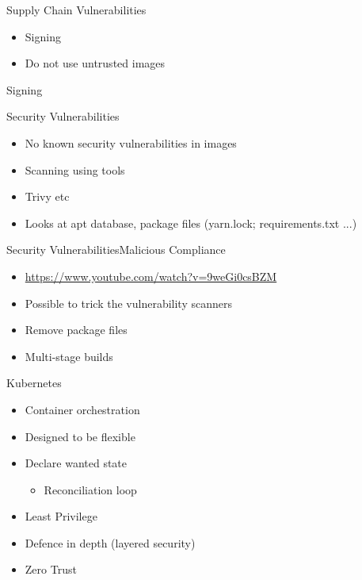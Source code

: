 \documentclass{dcpresentation}
\begin{document}
\begin{frame}{Supply Chain Vulnerabilities}
 \begin{itemize}
  \item Signing
  \item Do not use untrusted images
 \end{itemize}
Signing

\end{frame}

\begin{frame}{Security Vulnerabilities}
 \begin{itemize}
  \item No known security vulnerabilities in images
  \item Scanning using tools
  \item Trivy etc
  \item Looks at apt database, package files (yarn.lock; requirements.txt ...)
 \end{itemize}  
\end{frame}

\begin{frame}{Security Vulnerabilities}{Malicious Compliance}
 \begin{itemize}
  \item \url{https://www.youtube.com/watch?v=9weGi0csBZM}
  \item Possible to trick the vulnerability scanners
  \item Remove package files
  \item Multi-stage builds
 \end{itemize}  
\end{frame}


\begin{frame}{Kubernetes}
 \begin{itemize}
  \item Container orchestration
  \item Designed to be flexible
  \item Declare wanted state
  \begin{itemize}
   \item Reconciliation loop
  \end{itemize}
 \end{itemize}
\end{frame}


\begin{frame}
 \begin{itemize}
  \item Least Privilege
  \item Defence in depth (layered security)
  \item Zero Trust
 \end{itemize}
\end{frame}
\end{document}
